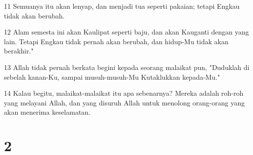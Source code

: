 \par 11 Semuanya itu akan lenyap, dan menjadi tua seperti pakaian; tetapi Engkau tidak akan berubah.
\par 12 Alam semesta ini akan Kaulipat seperti baju, dan akan Kauganti dengan yang lain. Tetapi Engkau tidak pernah akan berubah, dan hidup-Mu tidak akan berakhir."
\par 13 Allah tidak pernah berkata begini kepada seorang malaikat pun, "Duduklah di sebelah kanan-Ku, sampai musuh-musuh-Mu Kutaklukkan kepada-Mu."
\par 14 Kalau begitu, malaikat-malaikat itu apa sebenarnya? Mereka adalah roh-roh yang melayani Allah, dan yang disuruh Allah untuk menolong orang-orang yang akan menerima keselamatan.

\chapter{2}

